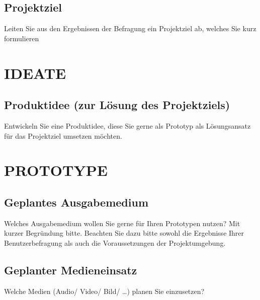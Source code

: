 \subsection{Projektziel}\label{Projektziel}
Leiten Sie aus den Ergebnissen der Befragung ein Projektziel ab, welches Sie kurz formulieren


\section{IDEATE}\label{IDEATE}


\subsection{Produktidee (zur Lösung des Projektziels)}\label{Produktidee (zur Lösung des Projektziels) }
Entwickeln Sie eine Produktidee, diese Sie gerne als Prototyp als Lösungsansatz für das Projektziel umsetzen möchten.

\section{PROTOTYPE}\label{PROTOTYPE}

\subsection{Geplantes Ausgabemedium}\label{Geplantes Ausgabemedium}
Welches Ausgabemedium wollen Sie gerne für Ihren Prototypen nutzen? Mit kurzer Begründung bitte. Beachten Sie dazu bitte sowohl die Ergebnisse Ihrer Benutzerbefragung als auch die Voraussetzungen der Projektumgebung.

\subsection{Geplanter Medieneinsatz}\label{Geplanter Medieneinsatz}
Welche Medien (Audio/ Video/ Bild/ …) planen Sie einzusetzen?


